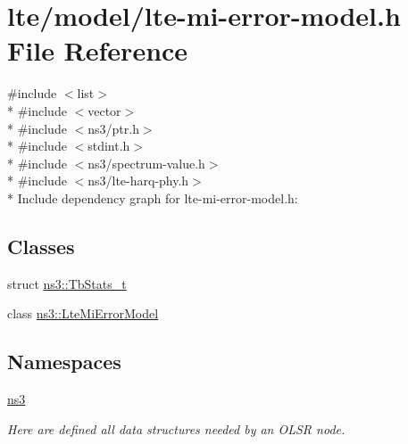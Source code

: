 \hypertarget{lte-mi-error-model_8h}{}\section{lte/model/lte-\/mi-\/error-\/model.h File Reference}
\label{lte-mi-error-model_8h}
{\ttfamily \#include $<$list$>$}\\*
{\ttfamily \#include $<$vector$>$}\\*
{\ttfamily \#include $<$ns3/ptr.\+h$>$}\\*
{\ttfamily \#include $<$stdint.\+h$>$}\\*
{\ttfamily \#include $<$ns3/spectrum-\/value.\+h$>$}\\*
{\ttfamily \#include $<$ns3/lte-\/harq-\/phy.\+h$>$}\\*
Include dependency graph for lte-\/mi-\/error-\/model.h\+:
\subsection*{Classes}
\begin{DoxyCompactItemize}
\item 
struct \hyperlink{structns3_1_1TbStats__t}{ns3\+::\+Tb\+Stats\+\_\+t}
\item 
class \hyperlink{classns3_1_1LteMiErrorModel}{ns3\+::\+Lte\+Mi\+Error\+Model}
\end{DoxyCompactItemize}
\subsection*{Namespaces}
\begin{DoxyCompactItemize}
\item 
 \hyperlink{namespacens3}{ns3}
\begin{DoxyCompactList}\small\item\em Here are defined all data structures needed by an O\+L\+SR node. \end{DoxyCompactList}\end{DoxyCompactItemize}
